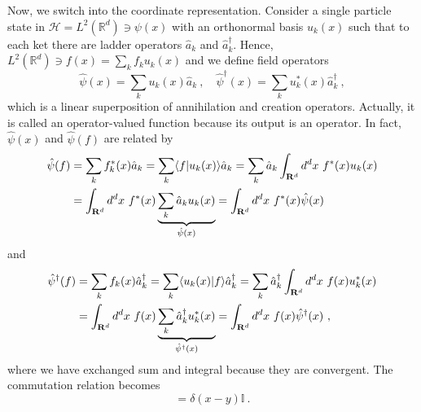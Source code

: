     Now, we switch into the coordinate representation. Consider a single particle state in $\mathcal H = L^2(\mathbb R^d) \ni \psi(x)$ with an orthonormal basis $u_k(x)$ such that to each ket there are ladder operators $\hat a_k$ and $\hat a_k^\dagger$. Hence, $L^2(\mathbb R^d) \ni f(x) = \sum_k f_k u_k(x)$ and we define field operators
    \begin{equation*}
        \hat \psi(x) = \sum_k u_k (x) \hat a_k ~, \quad \hat \psi^\dagger (x) = \sum_k u_k^* (x) \hat a_k^\dagger ~,
    \end{equation*}
    which is a linear superposition of annihilation and creation operators. Actually, it is called an operator-valued function because its output is an operator. In fact, $\hat \psi(x)$ and $\hat \psi (f)$ are related by
    \begin{equation*}
    \begin{aligned}
        \hat \psi(f) & = \sum_k f_k^* (x) \hat a_k = \sum_k \langle f\vert u_k(x)\rangle \hat a_k = \sum_k \hat a_k \int_{\mathbf R^d} d^d x ~ f^* (x) u_k (x) \\ & = \int_{\mathbf R^d} d^d x ~ f^* (x)\underbrace{\sum_k \hat a_k u_k (x)}_{\hat \psi (x)} = \int_{\mathbf R^d} d^d x ~ f^* (x) \hat \psi (x)
    \end{aligned}
    \end{equation*}
    and 
    \begin{equation*}
    \begin{aligned}
        \hat \psi^\dagger(f) & = \sum_k f_k (x) \hat a_k^\dagger = \sum_k \langle u_k(x)\vert f\rangle \hat a_k^\dagger = \sum_k \hat a_k^\dagger \int_{\mathbf R^d} d^d x ~ f (x) u_k^* (x) \\ & = \int_{\mathbf R^d} d^d x ~ f (x)\underbrace{\sum_k \hat a_k^\dagger u_k^* (x)}_{\hat \psi^\dagger (x)} = \int_{\mathbf R^d} d^d x ~ f (x) \hat \psi^\dagger (x) ~,
    \end{aligned}
    \end{equation*}
    where we have exchanged sum and integral because they are convergent. The commutation relation becomes
    \begin{equation*}
        [\hat \psi(x), \hat \psi^\dagger (y)] = \delta (x - y)  \mathbb I ~.
    \end{equation*}
